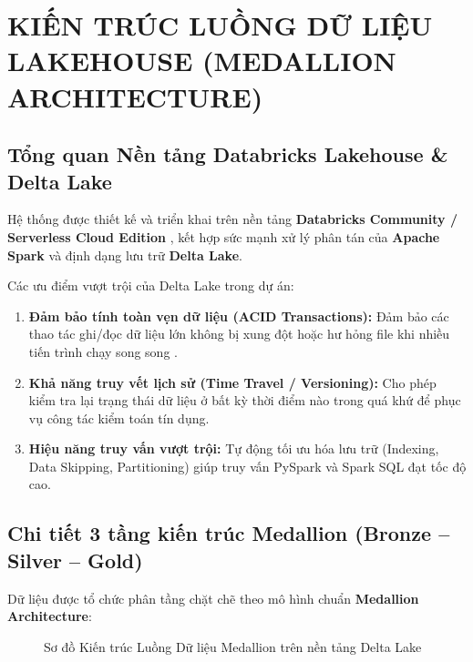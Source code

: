\chapter{KIẾN TRÚC LUỒNG DỮ LIỆU LAKEHOUSE (MEDALLION ARCHITECTURE)}

\section{Tổng quan Nền tảng Databricks Lakehouse \& Delta Lake}
Hệ thống được thiết kế và triển khai trên nền tảng \textbf{Databricks Community / Serverless Cloud Edition} \cite{databricks2026}, kết hợp sức mạnh xử lý phân tán của \textbf{Apache Spark} \cite{meng2016} và định dạng lưu trữ \textbf{Delta Lake}.

Các ưu điểm vượt trội của Delta Lake trong dự án:
\begin{enumerate}
    \item \textbf{Đảm bảo tính toàn vẹn dữ liệu (ACID Transactions):} Đảm bảo các thao tác ghi/đọc dữ liệu lớn không bị xung đột hoặc hư hỏng file khi nhiều tiến trình chạy song song \cite{databricks2026}.
    \item \textbf{Khả năng truy vết lịch sử (Time Travel / Versioning):} Cho phép kiểm tra lại trạng thái dữ liệu ở bất kỳ thời điểm nào trong quá khứ để phục vụ công tác kiểm toán tín dụng.
    \item \textbf{Hiệu năng truy vấn vượt trội:} Tự động tối ưu hóa lưu trữ (Indexing, Data Skipping, Partitioning) giúp truy vấn PySpark và Spark SQL đạt tốc độ cao.
\end{enumerate}

\section{Chi tiết 3 tầng kiến trúc Medallion (Bronze -- Silver -- Gold)}
Dữ liệu được tổ chức phân tầng chặt chẽ theo mô hình chuẩn \textbf{Medallion Architecture}:

\begin{figure}[h!]
\centering
\caption{Sơ đồ Kiến trúc Luồng Dữ liệu Medallion trên nền tảng Delta Lake}
\label{fig:sodo_medallion}
\end{figure}

